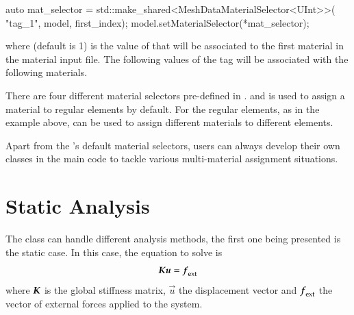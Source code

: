 \begin{cpp}
  auto mat_selector = std::make_shared<MeshDataMaterialSelector<UInt>>(
      "tag_1", model, first_index);
  model.setMaterialSelector(*mat_selector);
\end{cpp}

where  (default is 1) is the value of  that will
be associated to the first material in the material input file. The following
values of the tag will be associated with the following materials.

There are four different material selectors pre-defined in
\akantu.  and  is
used to assign a material to regular elements by default. For the
regular elements, as in the example above,
 can be used to assign different
materials to different elements. 

Apart from the \akantu's default material selectors, users can always
develop their own classes in the main code to tackle various
multi-material assignment situations.



\section{Static Analysis\label{sect:smm:static}}

The  class can handle different analysis
methods, the first one being presented is the static case.  In this
case, the equation to solve is
\begin{equation}
  \label{eqn:smm:static} \boldsymbol{K} \boldsymbol{u} =
  \boldsymbol{f}_{{\mathrm{ext}}}
\end{equation}
where $\boldsymbol{K}$ is the global stiffness matrix, $\vec{u}$ the
displacement vector and $\boldsymbol{f}_{{\mathrm{ext}}}$ the vector of external
forces applied to the system.

